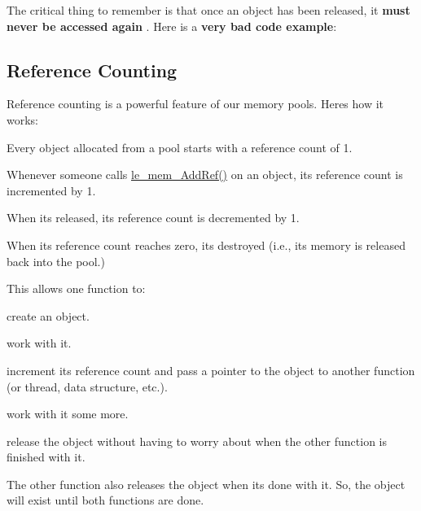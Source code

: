 The critical thing to remember is that once an object has been released, it {\bfseries  must never be accessed again }. Here is a {\bfseries  very bad code example}\+: 
\hypertarget{c_memory_mem_ref_counting}{}\subsection{Reference Counting}\label{c_memory_mem_ref_counting}
Reference counting is a powerful feature of our memory pools. Here\textquotesingle{}s how it works\+:
\begin{DoxyItemize}
\item Every object allocated from a pool starts with a reference count of 1.
\item Whenever someone calls \hyperlink{le__mem_8h_a92e869f92a344d61fb44922f99fe679b}{le\+\_\+mem\+\_\+\+Add\+Ref()} on an object, its reference count is incremented by 1.
\item When it\textquotesingle{}s released, its reference count is decremented by 1.
\item When its reference count reaches zero, it\textquotesingle{}s destroyed (i.\+e., its memory is released back into the pool.)
\end{DoxyItemize}

This allows one function to\+:
\begin{DoxyItemize}
\item create an object.
\item work with it.
\item increment its reference count and pass a pointer to the object to another function (or thread, data structure, etc.).
\item work with it some more.
\item release the object without having to worry about when the other function is finished with it.
\end{DoxyItemize}

The other function also releases the object when it\textquotesingle{}s done with it. So, the object will exist until both functions are done.

